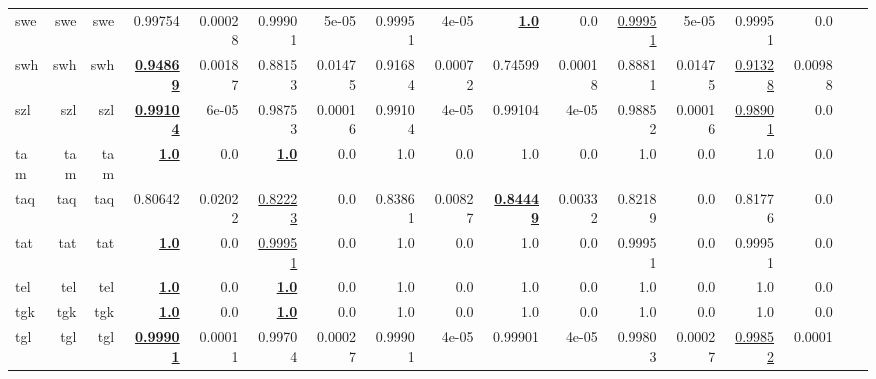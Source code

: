 \documentclass[11pt]{article}
\begin{document}
\begin{table*}[h]
{\begin{tabular}{lrrrrrrrrrrrrrrrr}
swe         & swe         & swe         & 0.99754         & 0.00028         & 0.99901         & 5e-05         & 0.99951         & 4e-05         & \textbf{\underline{1.0}}         & 0.0         & \underline{0.99951}         & 5e-05         & 0.99951         & 0.0         \\
swh         & swh         & swh         & \textbf{\underline{0.94869}}         & 0.00187         & 0.88153         & 0.01475         & 0.91684         & 0.00072         & 0.74599         & 0.00018         & 0.88811         & 0.01475         & \underline{0.91328}         & 0.00988         \\
szl         & szl         & szl         & \textbf{\underline{0.99104}}         & 6e-05         & 0.98753         & 0.00016         & 0.99104         & 4e-05         & 0.99104         & 4e-05         & 0.98852         & 0.00016         & \underline{0.98901}         & 0.0         \\
tam         & tam         & tam         & \textbf{\underline{1.0}}         & 0.0         & \textbf{\underline{1.0}}         & 0.0         & 1.0         & 0.0         & 1.0         & 0.0         & 1.0         & 0.0         & 1.0         & 0.0         \\
taq         & taq         & taq         & 0.80642         & 0.02022         & \underline{0.82223}         & 0.0         & 0.83861         & 0.00827         & \textbf{\underline{0.84449}}         & 0.00332         & 0.82189         & 0.0         & 0.81776         & 0.0         \\
tat         & tat         & tat         & \textbf{\underline{1.0}}         & 0.0         & \underline{0.99951}         & 0.0         & 1.0         & 0.0         & 1.0         & 0.0         & 0.99951         & 0.0         & 0.99951         & 0.0         \\
tel         & tel         & tel         & \textbf{\underline{1.0}}         & 0.0         & \textbf{\underline{1.0}}         & 0.0         & 1.0         & 0.0         & 1.0         & 0.0         & 1.0         & 0.0         & 1.0         & 0.0         \\
tgk         & tgk         & tgk         & \textbf{\underline{1.0}}         & 0.0         & \textbf{\underline{1.0}}         & 0.0         & 1.0         & 0.0         & 1.0         & 0.0         & 1.0         & 0.0         & 1.0         & 0.0         \\
tgl         & tgl         & tgl         & \textbf{\underline{0.99901}}         & 0.00011         & 0.99704         & 0.00027         & 0.99901         & 4e-05         & 0.99901         & 4e-05         & 0.99803         & 0.00027         & \underline{0.99852}         & 0.0001         \\

\end{tabular}}
\end{table*}
\end{document}
